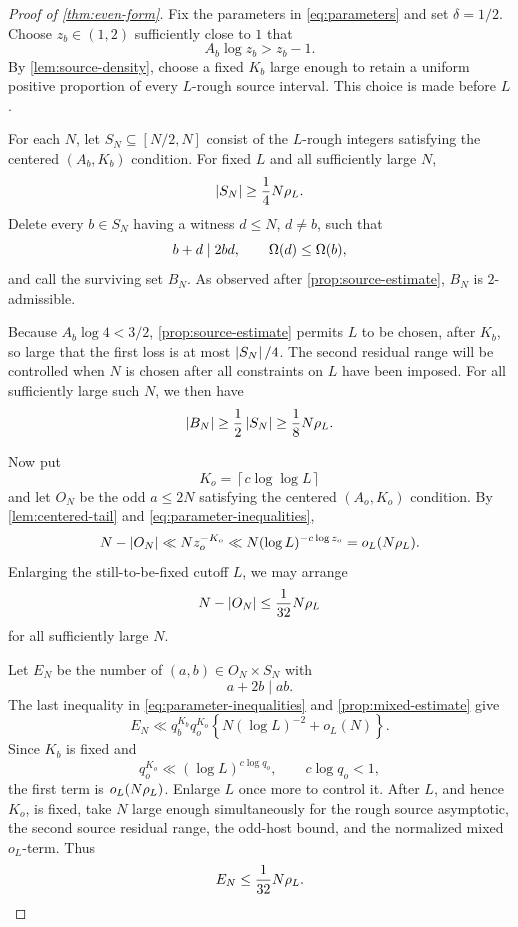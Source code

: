 \documentclass[11pt]{article}
\begin{document}
\begin{proof}[Proof of \cref{thm:even-form}]
Fix the parameters in \eqref{eq:parameters} and set \(\delta=1/2\). Choose
\(z_b\in(1,2)\) sufficiently close to \(1\) that
\[
 A_b\log z_b>z_b-1.
\]
By \cref{lem:source-density}, choose a fixed \(K_b\) large enough to retain a
uniform positive proportion of every \(L\)-rough source interval. This
choice is made before \(L\).

For each \(N\), let \(S_N\subseteq[N/2,N]\) consist of the \(L\)-rough
integers satisfying the centered \((A_b,K_b)\) condition. For fixed \(L\)
and all sufficiently large \(N\),
\[
 \left|S_N\right|\geq\frac14N\rho_L.
\]
Delete every \(b\in S_N\) having a witness \(d\leq N\), \(d\ne b\), such
that
\[
 b+d\mid2bd,\qquad \Omega(d)\leq\Omega(b),
\]
and call the surviving set \(B_N\). As observed after
\cref{prop:source-estimate}, \(B_N\) is \(2\)-admissible.

Because \(A_b\log4<3/2\), \cref{prop:source-estimate} permits \(L\) to be
chosen, after \(K_b\), so large that the first loss is at most
\(\left|S_N\right|/4\). The second residual range will be controlled when \(N\) is
chosen after all constraints on \(L\) have been imposed. For all sufficiently
large such \(N\), we then have
\begin{equation}\label{eq:B-density}
 \left|B_N\right|\geq\frac12\left|S_N\right|
 \geq\frac18N\rho_L.
\end{equation}

Now put
\[
 K_o=\left\lceil c\log\log L\right\rceil
\]
and let \(O_N\) be the odd \(a\leq2N\) satisfying the centered
\((A_o,K_o)\) condition. By \cref{lem:centered-tail} and
\eqref{eq:parameter-inequalities},
\[
 N-\left|O_N\right|
 \ll Nz_o^{-K_o}
 \ll N(\log L)^{-c\log z_o}
 =o_L(N\rho_L).
\]
Enlarging the still-to-be-fixed cutoff \(L\), we may arrange
\begin{equation}\label{eq:odd-loss}
 N-\left|O_N\right|\leq\frac1{32}N\rho_L
\end{equation}
for all sufficiently large \(N\).

Let \(E_N\) be the number of \((a,b)\in O_N\times S_N\) with
\[
 a+2b\mid ab.
\]
The last inequality in \eqref{eq:parameter-inequalities} and
\cref{prop:mixed-estimate} give
\[
 E_N\ll q_b^{K_b}q_o^{K_o}
 \left\{N(\log L)^{-2}+o_L(N)\right\}.
\]
Since \(K_b\) is fixed and
\[
 q_o^{K_o}\ll(\log L)^{c\log q_o},
\qquad c\log q_o<1,
\]
the first term is \(o_L(N\rho_L)\). Enlarge \(L\) once more to control it.
After \(L\), and hence \(K_o\), is fixed, take \(N\) large enough
simultaneously for the rough source asymptotic, the second source residual
range, the odd-host bound, and the normalized mixed \(o_L\)-term. Thus
\begin{equation}\label{eq:edge-loss}
 E_N\leq\frac1{32}N\rho_L.
\end{equation}


\end{proof}
\end{document}
